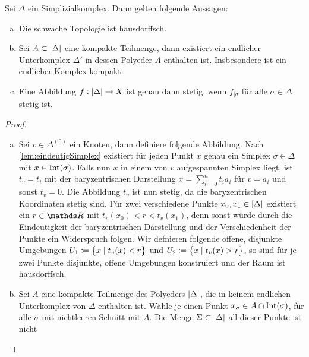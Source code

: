 \begin{Satz}
  Sei $\Delta$ ein Simplizialkomplex. Dann gelten folgende Aussagen:
  \begin{enumerate}[(a)]
        \item Die schwache Topologie ist hausdorffsch.
        \item Sei $A \subset \left| \Delta \right|$ eine kompakte Teilmenge,
          dann existiert ein endlicher \\Unterkomplex $\Delta'$ in
          dessen Polyeder $A$ enthalten ist. Insbesondere ist ein
          endlicher Komplex kompakt.
        \item Eine Abbildung $f: \left| \Delta \right| \rightarrow X$ ist genau
          dann stetig, wenn $f_{| \sigma}$ für alle
          $\sigma \in \Delta$ stetig ist.
	\end{enumerate}\pagebreak
	\begin{proof}
          \begin{enumerate}[(a)]
          \item Sei $v \in \Delta^{(0)}$ ein Knoten, dann definiere
            folgende Abbildung.  Nach \cref{lem:eindeutigSimplex}
            existiert für jeden Punkt $x$ genau ein Simplex
            $\sigma \in \Delta$ mit $x \in \operatorname{Int}(\sigma)$. Falls nun
            $x$ in einem von $v$ aufgespannten Simplex liegt, ist
            $t_v = t_i$ mit der baryzentrischen Darstellung
            $x = \sum^{n}_{i=0} t_i a_i$ für $v=a_i $ und sonst
            $t_v = 0$.  Die Abbildung $t_v$ ist nun stetig, da die
            baryzentrischen Koordinaten stetig sind. Für zwei
            verschiedene Punkte $x_0,x_1 \in \left| \Delta \right|$ existiert
            ein $r \in \R$ mit $t_v(x_0) < r < t_v(x_1)$, denn sonst
            würde durch die Eindeutigkeit der baryzentrischen
            Darstellung und der Verschiedenheit der Punkte ein
            Widerspruch folgen. Wir defnieren folgende offene,
            disjunkte Umgebungen $U_1 \coloneqq \bigl\{ x \; | \;  t_v(x)<r \bigr\}$
            und $U_2 \coloneqq \bigl\{ x \; | \;  t_v(x)>r \bigr\}$, so sind für je
            zwei Punkte disjunkte, offene Umgebungen konstruiert und
            der Raum ist hausdorffsch.
          \item Sei $A$ eine kompakte Teilmenge des Polyeders
            $\left| \Delta \right|$, die in keinem endlichen Unterkomplex von
            $\Delta$ enthalten ist. Wähle je einen Punkt
            $x_\sigma \in A \cap \operatorname{Int}(\sigma)$, für \\alle $\sigma$ mit
            nichtleeren Schnitt mit $A$. Die Menge
            $\Sigma \subset \left| \Delta \right|$ all dieser Punkte ist nicht

\end{enumerate}
\end{proof}
\end{Satz}
